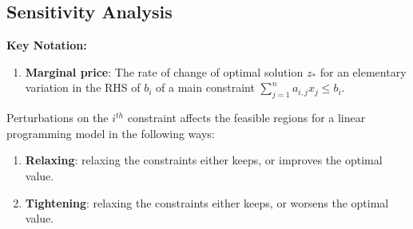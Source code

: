 \documentclass{article}
\begin{document}
\subsection{Sensitivity Analysis}

\textbf{Key Notation:}
\begin{enumerate}
    \item \textbf{Marginal price}: The rate of change of optimal solution \(z_*\) for an elementary variation in the RHS of \(b_i\) of a main constraint \(\sum_{j=1}^{n} a_{i,j} x_j \leq b_i\).
\end{enumerate}

Perturbations on the \(i^{th}\) constraint affects the feasible regions for a linear programming model in the following ways:
\begin{enumerate}
    \item \textbf{Relaxing}: relaxing the constraints either keeps, or improves the optimal value.
    \item \textbf{Tightening}: relaxing the constraints either keeps, or worsens the optimal value.
\end{enumerate}
\end{document}
